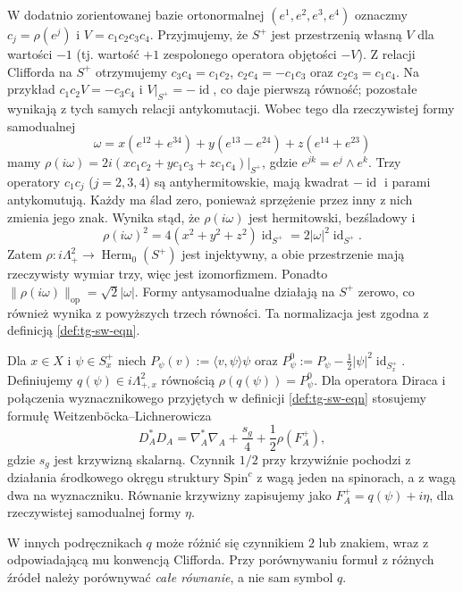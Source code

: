 W dodatnio zorientowanej bazie ortonormalnej
$(e^1,e^2,e^3,e^4)$ oznaczmy $c_j=\rho(e^j)$
i $V=c_1c_2c_3c_4$. Przyjmujemy, że $S^+$
jest przestrzenią własną $V$ dla wartości $-1$
(tj. wartość $+1$ zespolonego operatora objętości $-V$).
Z relacji Clifforda na $S^+$ otrzymujemy
$c_3c_4=c_1c_2$, $c_2c_4=-c_1c_3$ oraz
$c_2c_3=c_1c_4$. Na przykład
$c_1c_2 V=-c_3c_4$ i $V|_{S^+}=-\operatorname{id}$,
co daje pierwszą równość; pozostałe wynikają
z tych samych relacji antykomutacji.
Wobec tego dla rzeczywistej formy samodualnej
\[
\omega=x(e^{12}+e^{34})+
y(e^{13}-e^{24})+z(e^{14}+e^{23})
\]
mamy $\rho(i\omega)=2i(xc_1c_2+yc_1c_3+zc_1c_4)|_{S^+}$,
gdzie $e^{jk}=e^j\wedge e^k$.
Trzy operatory $c_1c_j$ ($j=2,3,4$)
są antyhermitowskie, mają kwadrat $-\operatorname{id}$
i parami antykomutują. Każdy ma ślad zero,
ponieważ sprzężenie przez inny z nich zmienia jego znak.
Wynika stąd, że $\rho(i\omega)$ jest hermitowski,
bezśladowy i
\[
\rho(i\omega)^2=4(x^2+y^2+z^2)\operatorname{id}_{S^+}
=2|\omega|^2\operatorname{id}_{S^+}.
\]
Zatem $\rho:i\Lambda^2_+\to\operatorname{Herm}_0(S^+)$
jest injektywny, a obie przestrzenie mają rzeczywisty
wymiar trzy, więc jest izomorfizmem.
Ponadto $\|\rho(i\omega)\|_{\mathrm{op}}=\sqrt2|\omega|$.
Formy antysamodualne działają na $S^+$ zerowo,
co również wynika z powyższych trzech równości.
Ta normalizacja jest zgodna z definicją
\ref{def:tg-sw-eqn}.

\begin{definicja}
\label{def:tg-sw12-q}
Dla $x\in X$ i $\psi\in S_x^+$ niech
$P_\psi(v):=\langle v,\psi\rangle\psi$ oraz
$P_\psi^0:=P_\psi-\tfrac12|\psi|^2\operatorname{id}_{S_x^+}$.
Definiujemy $q(\psi)\in i\Lambda^2_{+,x}$ równością
$\rho(q(\psi))=P_\psi^0$.
Dla operatora Diraca i połączenia wyznacznikowego
przyjętych w definicji \ref{def:tg-sw-eqn}
stosujemy formułę Weitzenböcka--Lichnerowicza
\[
D_A^*D_A=\nabla_A^*\nabla_A+\frac{s_g}{4}
 +\frac12\rho(F_A^+),
\]
gdzie $s_g$ jest krzywizną skalarną. Czynnik $1/2$
przy krzywiźnie pochodzi z działania środkowego
okręgu struktury $\mathrm{Spin}^c$ z wagą jeden
na spinorach, a z wagą dwa na wyznaczniku.
Równanie krzywizny
zapisujemy jako $F_A^+=q(\psi)+i\eta$, dla rzeczywistej
samodualnej formy $\eta$.
\end{definicja}

W innych podręcznikach $q$ może różnić się czynnikiem $2$
lub znakiem, wraz z odpowiadającą mu konwencją Clifforda.
Przy porównywaniu formuł z różnych źródeł należy porównywać
\emph{całe równanie}, a nie sam symbol $q$.

